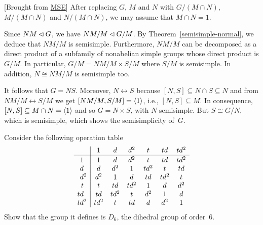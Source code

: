 \begin{solution}
\begin{solution} {[Brought from \href{https://math.stackexchange.com/a/1217299/269050}{MSE}]} After replacing $G$, $M$ and $N$ with $G/(M\cap N)$, $M/(M\cap N)$ and $N/(M\cap N)$, we may assume that $M\cap N=1$.

Since $NM\lhd G$, we have $NM/M\lhd G/M$. By Theorem~\ref{semisimple-normal}, we deduce that $NM/M$ is semisimple. Furthermore, $NM/M$ can be decomposed as a direct product of a subfamily of nonabelian simple groups whose direct product is $G/M$. In particular, $G/M=NM/M\times S/M$ where $S/M$ is semisimple. In addition, $N\cong NM/M$ is semisimple too.

It follows that $G=NS$. Moreover, $N\leftrightarrow S$ because $[N,S]\subseteq N\cap S\subseteq N$ and from $NM/M\leftrightarrow S/M$ we get $[NM/M,S/M]=\langle1\rangle$, i.e., $[N,S]\subseteq M$. In consequence, $[N,S]\subseteq M\cap N=\langle1\rangle$ and so $G=N\times S$, with $N$ semisimple. But $S\cong G/N$, which is semisimple, which shows the semisimplicity of~$G$.  \end{solution}

\begin{exr}
    Consider the following operation table
    {\small
    $$
        \begin{array}{r|ccccccc}
                & 1 & d & d^2 & t & td & td^2 \\
            \hline
            \vphantom{{1^{1{^1}}}}
            1\phantom{{}^2} & 1 & d & d^2 & t & td & td^2 \\
            d\phantom{{}^2} & d & d^2 & 1 & td^2 & t & td \\
            d^2 & d^2 & 1 & d & td & td^2 & t \\
            t\phantom{{}^2} & t & td & td^2 & 1 & d & d^2 \\
            td\phantom{{}^2} & td & td^2 & t & d^2 & 1 & d \\
            td^2 & td^2 & t & td & d & d^2 & 1 \\
    \end{array}
    $$
    }
    Show that the group it defines is $D_6$, the dihedral group of order\/~$6$.
\end{exr}


\end{solution}
